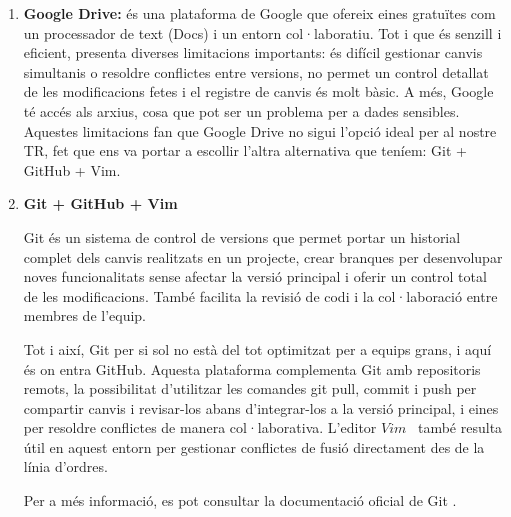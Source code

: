 \begin{enumerate}
 \item \textbf{Google Drive: }és una plataforma de Google que ofereix eines gratuïtes com un processador de text (Docs) i un entorn col·laboratiu. Tot i que és senzill i eficient, presenta diverses limitacions importants: és difícil gestionar canvis simultanis o resoldre conflictes entre versions, no permet un control detallat de les modificacions fetes i el registre de canvis és molt bàsic. A més, Google té accés als arxius, cosa que pot ser un problema per a dades sensibles. Aquestes limitacions fan que Google Drive no sigui l’opció ideal per al nostre TR, fet que ens va portar a escollir l’altra alternativa que teníem: Git + GitHub + Vim.
\item \textbf{Git + GitHub + Vim}

Git és un sistema de control de versions \cite{ControlDeVersions} que permet portar un historial complet dels canvis realitzats en un projecte, crear branques per desenvolupar noves funcionalitats sense afectar la versió principal i oferir un control total de les modificacions. També facilita la revisió de codi i la col·laboració entre membres de l’equip.

Tot i així, Git per si sol no està del tot optimitzat per a equips grans, i aquí és on entra GitHub. Aquesta plataforma complementa Git amb repositoris remots, la possibilitat d’utilitzar les comandes git pull, commit i push per compartir canvis i revisar-los abans d’integrar-los a la versió principal, i eines per resoldre conflictes de manera col·laborativa. L’editor $Vim$~\cite{Vim} també resulta útil en aquest entorn per gestionar conflictes de fusió directament des de la línia d’ordres.\\

Per a més informació, es pot consultar la documentació oficial de Git \cite{PaginaoficialdelGit}.
\end{enumerate}

